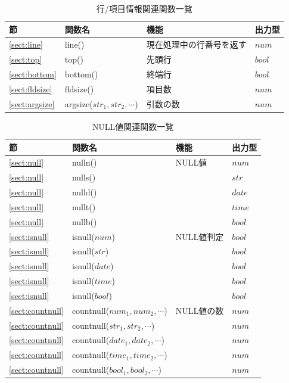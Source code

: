 \begin{table}[!hb]
\begin{center}
\caption{行/項目情報関連関数一覧\label{tbl:mcal_line}}

{\small
  \begin{tabular}{l|l|l|l} \hline
節&関数名&機能&出力型\\ \hline

\ref{sect:line}   & line()   &現在処理中の行番号を返す&$num$\\
\ref{sect:top}    & top()    &先頭行&$bool$\\
\ref{sect:bottom} & bottom() &終端行&$bool$\\
\ref{sect:fldsize}& fldsize()&項目数&$num$\\
\ref{sect:argsize}& argsize($str_1,str_2,\cdots$)&引数の数&$num$\\

\hline
  \end{tabular}
  }
  \end{center}
\end{table}

\begin{table}[!hb]
\begin{center}
\caption{NULL値関連関数一覧\label{tbl:mcal_null}}
{\small
  \begin{tabular}{l|l|l|l} \hline
節&関数名&機能&出力型\\ \hline

\ref{sect:null}& nulln()&NULL値& $num$ \\
\ref{sect:null}& nulls()&      & $str$ \\
\ref{sect:null}& nulld()&      & $date$ \\
\ref{sect:null}& nullt()&      & $time$ \\
\ref{sect:null}& nullb()&      & $bool$ \\
\hline
\ref{sect:isnull}& isnull($num$)&NULL値判定& $bool$\\
\ref{sect:isnull}& isnull($str$)&          & $bool$\\
\ref{sect:isnull}& isnull($date$)&         & $bool$\\
\ref{sect:isnull}& isnull($time$)&         & $bool$\\
\ref{sect:isnull}& isnull($bool$)&         & $bool$\\
\hline
\ref{sect:countnull}& countnull($num_1,num_2,\cdots$)& NULL値の数 & $num$\\
\ref{sect:countnull}& countnull($str_1,str_2,\cdots$)& & $num$\\
\ref{sect:countnull}& countnull($date_1,date_2,\cdots$)& & $num$\\
\ref{sect:countnull}& countnull($time_1,time_2,\cdots$)& & $num$\\
\ref{sect:countnull}& countnull($bool_1,bool_2,\cdots$)& & $num$\\

\hline
  \end{tabular}
  }
  \end{center}
\end{table}


